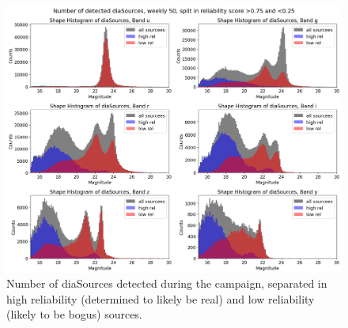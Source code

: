 \begin{figure}
  \includegraphics[width=\textwidth]{dia/figures/diaSource_real_bogus.png}
  \caption{Number of diaSources detected during the campaign, separated in high reliability (determined to likely be real) and low reliability (likely to be bogus) sources.}
  \label{fig:diaSrc_real_bogus}
\end{figure}

